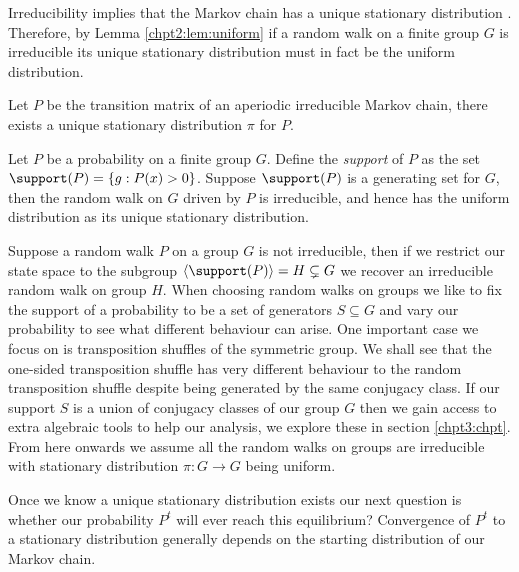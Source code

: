 \documentclass[11pt]{report}
\begin{document}
Irreducibility implies that the Markov chain has a unique stationary distribution \cite[Corollary 1.17]{Levin2017}. Therefore, by Lemma \ref{chpt2:lem:uniform} if a 
random walk on a finite group $G$ is irreducible its unique stationary distribution must in fact be the uniform distribution.

\begin{lemma}
	Let $P$ be the transition matrix of an aperiodic irreducible Markov chain, there 
	exists a unique stationary distribution $\pi$ for $P$. 
\end{lemma}


\begin{corollary}
	Let $P$ be a probability on a finite group $G$. Define the \emph{support} of $P$ as the set $\support(P) =\{g : 
	P(x)>0\}$. Suppose $\support(P)$ 
	is a generating set for $G$, then the 
	random walk on $G$ driven by $P$ is irreducible, and hence has the uniform distribution as its unique stationary distribution.
\end{corollary}

Suppose a random walk $P$ on a group $G$ is not 
irreducible, then if we 
restrict our state space to the subgroup $ \langle \support(P) \rangle =H 
\subsetneq G$ we recover an irreducible random walk on group $H$.
When choosing random walks on groups we like to fix the support of a 
probability to be a set of generators $S \subseteq G$ and vary our probability to see what different behaviour can arise.  One important case we focus on is transposition shuffles of the symmetric group.
We shall see that the one-sided transposition shuffle has very different behaviour to the random transposition shuffle despite being generated by the same conjugacy class.
If our support $S$ is a union of conjugacy classes of our group $G$ then we gain access to extra algebraic tools to help our analysis, we explore these in section \ref{chpt3:chpt}. From here onwards we assume all the random walks on 
groups are irreducible with stationary distribution $\pi: G\to G$ being uniform.

Once we know a unique stationary distribution exists our next question is 
whether our probability $P^{t}$ will ever reach this equilibrium? Convergence 
of $P^{t}$ to a stationary distribution generally depends on the starting 
distribution of our Markov chain. 
\end{document}
